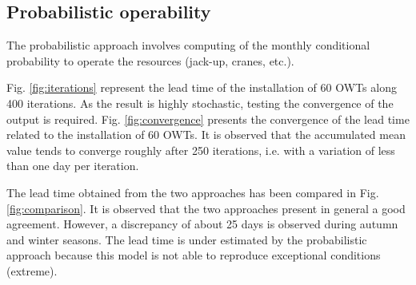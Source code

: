 \subsection{Probabilistic operability}
The probabilistic approach involves computing of the monthly conditional probability to operate the resources (jack-up, cranes, etc.). %

Fig. \ref{fig:iterations} represent the lead time of the installation of 60 OWTs along 400 iterations. As the result is highly stochastic, testing the convergence of the output is required. Fig. \ref{fig:convergence} presents the convergence of the lead time related to the installation of 60 OWTs. It is observed that the accumulated mean value tends to converge roughly after 250 iterations, i.e. with a variation of less than one day per iteration.

The lead time obtained from the two approaches has been compared in Fig. \ref{fig:comparison}. It is observed that the two approaches present in general a good agreement. However, a discrepancy of about 25 days is observed during autumn and winter seasons. The lead time is under estimated by the probabilistic approach because this model is not able to reproduce exceptional conditions (extreme).


